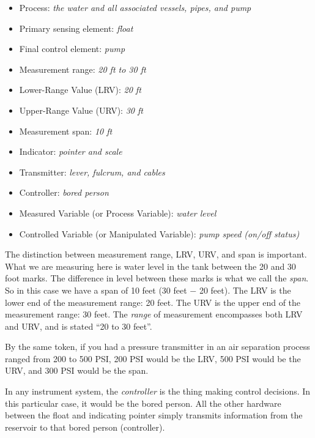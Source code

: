 





\begin{itemize}
\item{} Process: {\it the water and all associated vessels, pipes, and pump}
\item{} Primary sensing element: {\it float}
\item{} Final control element: {\it pump}
\item{} Measurement range: {\it 20 ft to 30 ft}
\item{} Lower-Range Value (LRV): {\it 20 ft}
\item{} Upper-Range Value (URV): {\it 30 ft}
\item{} Measurement span: {\it 10 ft}
\item{} Indicator: {\it pointer and scale}
\item{} Transmitter: {\it lever, fulcrum, and cables}
\item{} Controller: {\it bored person}
\item{} Measured Variable (or Process Variable): {\it water level}
\item{} Controlled Variable (or Manipulated Variable): {\it pump speed (on/off status)}
\end{itemize}

The distinction between measurement range, LRV, URV, and span is important.  What we are measuring here is water level in the tank between the 20 and 30 foot marks.  The difference in level between these marks is what we call the {\it span}.  So in this case we have a span of 10 feet (30 feet $-$ 20 feet).  The LRV is the lower end of the measurement range: 20 feet.  The URV is the upper end of the measurement range: 30 feet.  The {\it range} of measurement encompasses both LRV and URV, and is stated ``20 to 30 feet''.

By the same token, if you had a pressure transmitter in an air separation process ranged from 200 to 500 PSI, 200 PSI would be the LRV, 500 PSI would be the URV, and 300 PSI would be the span.

\vskip 10pt

In any instrument system, the {\it controller} is the thing making control decisions.  In this particular case, it would be the bored person.  All the other hardware between the float and indicating pointer simply transmits information from the reservoir to that bored person (controller).

